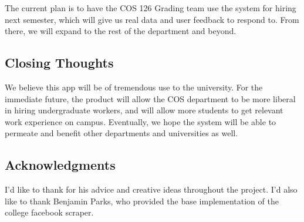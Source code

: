 The current plan is to have the COS 126 Grading team use the system for hiring next semester, which will give us real data and user feedback to respond to. From there, we will expand to the rest of the department and beyond.

\subsection{Closing Thoughts}

We believe this app will be of tremendous use to the university. For the immediate future, the product will allow the COS department to be more liberal in hiring undergraduate workers, and will allow more students to get relevant work experience on campus. Eventually, we hope the system will be able to permeate and benefit other departments and universities as well.

\subsection{Acknowledgments}

I'd like to thank \advisor{} for his advice and creative ideas throughout the project. I'd also like to thank Benjamin Parks, who provided the base implementation of the college facebook scraper.
